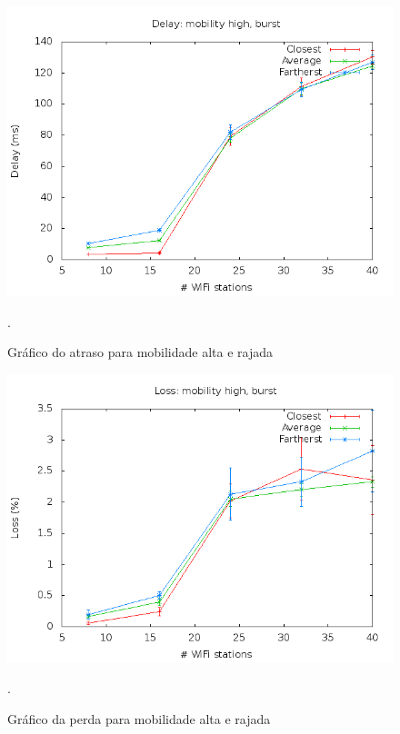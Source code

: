 \documentclass[12pt,twoside,a4paper]{article}
\begin{document}
\begin{figure}[H]
\centering
\includegraphics[scale=0.5]{mo818-delay-mob-2-traf-1}
\caption{Gráfico do atraso para mobilidade alta e rajada}.
\label{fig:atraso-m2-t1}
\end{figure}

\begin{figure}[H]
\centering
\includegraphics[scale=0.5]{mo818-loss-mob-2-traf-1}
\caption{Gráfico da perda para mobilidade alta e rajada}.
\label{fig:perda-m2-t1}
\end{figure}
\end{document}
